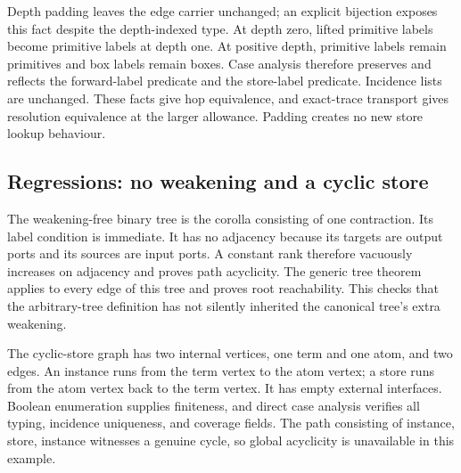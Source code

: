 

Depth padding leaves the edge carrier unchanged; an explicit bijection
exposes this fact despite the depth-indexed type. At depth zero, lifted
primitive labels become primitive labels at depth one. At positive depth,
primitive labels remain primitives and box labels remain boxes. Case
analysis therefore preserves and reflects the forward-label predicate and
the store-label predicate. Incidence lists are unchanged. These facts give
hop equivalence, and exact-trace transport gives resolution equivalence
at the larger allowance. Padding creates no new store lookup behaviour.




\subsection{Regressions: no weakening and a cyclic store}

The weakening-free binary tree is the corolla consisting of one contraction.
Its label condition is immediate. It has no adjacency because its targets
are output ports and its sources are input ports. A constant rank therefore
vacuously increases on adjacency and proves path acyclicity. The generic
tree theorem applies to every edge of this tree and proves root reachability.
This checks that the arbitrary-tree definition has not silently inherited
the canonical tree's extra weakening.



The cyclic-store graph has two internal vertices, one term and one atom,
and two edges. An instance runs from the term vertex to the atom vertex;
a store runs from the atom vertex back to the term vertex. It has empty
external interfaces. Boolean enumeration supplies finiteness, and direct
case analysis verifies all typing, incidence uniqueness, and coverage
fields. The path consisting of instance, store, instance witnesses a genuine
cycle, so global acyclicity is unavailable in this example.

